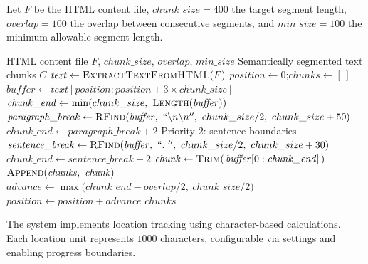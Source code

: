 \noindent Let $F$ be the HTML content file, $chunk\_size = 400$ the target segment length, $overlap = 100$ the overlap between consecutive segments, and $min\_size = 100$ the minimum allowable segment length.

\begin{algorithm}[!t]
\caption{Semantic Boundary Detection}
\label{alg:semantic-boundary-detection}
\begin{algorithmic}[1]
\Require HTML content file $F$, $chunk\_size$, $overlap$, $min\_size$
\Ensure Semantically segmented text chunks $C$
\State $\mathit{text} \leftarrow \Call{ExtractTextFromHTML}{F}$
\State $\mathit{position} \leftarrow 0$;\quad $\mathit{chunks} \leftarrow [\,]$
    \State $\mathit{buffer} \leftarrow \mathit{text}[\mathit{position} : \mathit{position} + 3 \times chunk\_size]$
    \State $\mathit{chunk\_end} \leftarrow \min(chunk\_size,\ \Call{Length}{\mathit{buffer}})$
    \Statex {}
    \State $\mathit{paragraph\_break} \leftarrow \Call{RFind}{\mathit{buffer},\ ``\backslash n\backslash n'',\ chunk\_size/2,\ chunk\_size+50}$    
        \State $\mathit{chunk\_end} \leftarrow \mathit{paragraph\_break} + 2$
    \Else
        \Comment Priority 2: sentence boundaries
        \State $\mathit{sentence\_break} \leftarrow \Call{RFind}{\mathit{buffer},\ ``.\ '',\ chunk\_size/2,\ chunk\_size+30}$
            \State $\mathit{chunk\_end} \leftarrow \mathit{sentence\_break} + 2$
        \EndIf
    \EndIf
    \State $\mathit{chunk} \leftarrow \Call{Trim}{\,\mathit{buffer}[0 : \mathit{chunk\_end}]\,}$
        \State $\Call{Append}{\mathit{chunks},\ \mathit{chunk}}$
    \EndIf
    \State $\mathit{advance} \leftarrow \max\bigl(\mathit{chunk\_end} - overlap/2,\ chunk\_size/2\bigr)$
    \State $\mathit{position} \leftarrow \mathit{position} + \mathit{advance}$
        \State {}
    \EndIf
\EndWhile
\State \Return $\mathit{chunks}$
\end{algorithmic}
\end{algorithm}

The system implements location tracking using character-based calculations. Each location unit represents $1000$ characters, configurable via settings and enabling progress boundaries.

